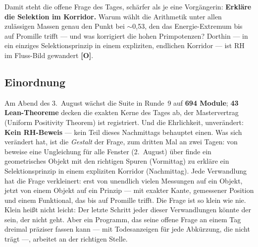 \documentclass[11pt,a4paper]{article}
\newcommand{\OO}{\textcolor{offen}{\textbf{[O]}}}
\begin{document}
Damit steht die offene Frage des Tages, schärfer als je eine
Vorgängerin: \textbf{\glqq{}Erkläre die Selektion im
Korridor.\grqq{}} Warum wählt die Arithmetik unter allen zulässigen
Massen genau den Punkt bei $\sim$0{,}53, den das Energie-Extremum
bis auf Promille trifft --- und was korrigiert die hohen
Primpotenzen? Dorthin --- in ein einziges Selektionsprinzip in
einem expliziten, endlichen Korridor --- ist RH im Fluss-Bild
gewandert \OO{}.

\subsection*{Einordnung}

Am Abend des 3.~August wächst die Suite in Runde~9 auf
\textbf{694 Module}; \textbf{43 Lean-Theoreme} decken die exakten
Kerne des Tages ab, der Mastervertrag (Uniform Positivity Theorem)
ist registriert. Und die Ehrlichkeit, unverändert: \textbf{Kein
RH-Beweis} --- kein Teil dieses Nachmittags behauptet einen. Was
sich verändert hat, ist die \emph{Gestalt} der Frage, zum dritten
Mal an zwei Tagen: von \glqq{}beweise eine Ungleichung für alle
Fenster\grqq{} (2.~August) über \glqq{}finde ein geometrisches
Objekt mit den richtigen Spuren\grqq{} (Vormittag) zu
\glqq{}erkläre ein Selektionsprinzip in einem expliziten
Korridor\grqq{} (Nachmittag). Jede Verwandlung hat die Frage
verkleinert: erst von unendlich vielen Messungen auf ein Objekt,
jetzt von einem Objekt auf ein Prinzip --- mit exakter Kante,
gemessener Position und einem Funktional, das bis auf Promille
trifft. Die Frage ist so klein wie nie. Klein heißt nicht leicht:
Der letzte Schritt jeder dieser Verwandlungen könnte der sein, der
nicht geht. Aber ein Programm, das seine offene Frage an einem Tag
dreimal präziser fassen kann --- mit Todesanzeigen für jede
Abkürzung, die nicht trägt ---, arbeitet an der richtigen Stelle.
\end{document}
